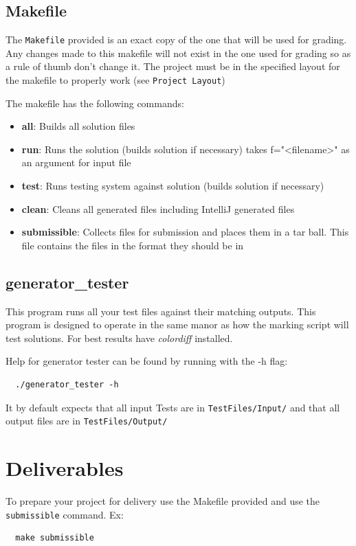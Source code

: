 \documentclass{article}
\begin{document}
\subsection{Makefile}
The \texttt{Makefile} provided is an exact copy of the one that will be used for grading.  Any changes made to
this makefile will not exist in the one used for grading so as a rule of thumb don't change it. The project must
be in the specified layout for the makefile to properly work (see \texttt{Project Layout})

The makefile has the following commands:
\begin{itemize}
  \item{\textbf{all}}: Builds all solution files
  \item{\textbf{run}}: Runs the solution (builds solution if necessary) takes f="<filename>" as an argument for
    input file
  \item{\textbf{test}}: Runs testing system against solution (builds solution if necessary)
  \item{\textbf{clean}}: Cleans all generated files including IntelliJ generated files
  \item{\textbf{submissible}}: Collects files for submission and places them in a tar ball. This file contains
  the files in the format they should be in
\end{itemize}

\subsection{generator\_tester}
This program runs all your test files against their matching outputs. This program is designed to operate in the
same manor as how the marking script will test solutions. For best results have \textit{colordiff} installed.

Help for generator tester can be found by running with the -h flag:
\begin{lstlisting}
  ./generator_tester -h
\end{lstlisting}

It by default expects that all input Tests are in \texttt{TestFiles/Input/} and that  all output files are in
\texttt{TestFiles/Output/}

\section{Deliverables}
To prepare your project for delivery use the Makefile provided and use the \texttt{submissible} command. Ex:
\begin{lstlisting}
  make submissible
\end{lstlisting}
\end{document}
